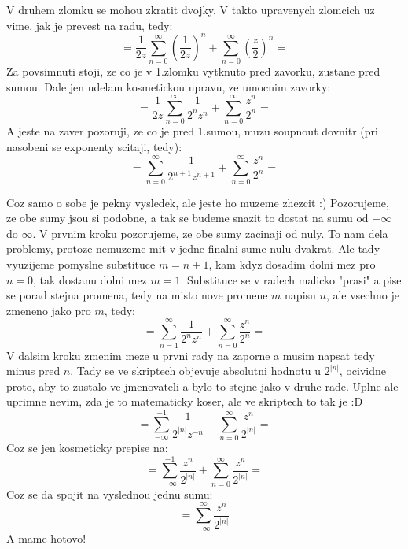 V druhem zlomku se mohou zkratit dvojky. V takto upravenych zlomcich uz vime, jak je prevest na radu, tedy:
$$ = \frac{1}{2z} \sum_{n=0}^\infty \left( \frac{1}{2z}\right)^n + \sum_{n=0}^\infty \left(\frac{z}{2}\right) ^n = $$
Za povsimnuti stoji, ze co je v 1.zlomku vytknuto pred zavorku, zustane pred sumou. Dale jen udelam kosmetickou upravu, ze umocnim zavorky:
$$=\frac{1}{2z} \sum_{n=0}^\infty \frac{1}{2^n z^n} + \sum_{n=0}^\infty \frac{z^n}{2^n} =$$
A jeste na zaver pozoruji, ze co je pred 1.sumou, muzu soupnout dovnitr (pri nasobeni se exponenty scitaji, tedy):
$$ = \sum_{n=0}^\infty \frac{1}{2^{n+1} z^{n+1}} + \sum_{n=0}^\infty \frac{z^n}{2^n} = $$

Coz samo o sobe je pekny vysledek, ale jeste ho muzeme zhezcit :) Pozorujeme, ze obe sumy jsou si podobne, a tak se budeme snazit to dostat na sumu od $-\infty$ do $\infty$. V prvnim kroku pozorujeme, ze obe sumy zacinaji od nuly. To nam dela problemy, protoze nemuzeme mit v jedne finalni sume nulu dvakrat. Ale tady vyuzijeme pomyslne substituce $m=n+1$, kam kdyz dosadim dolni mez pro $n=0$, tak dostanu dolni mez $m=1$. Substituce se v radech malicko "prasi" a pise se porad stejna promena, tedy na misto nove promene $m$ napisu $n$, ale vsechno je zmeneno jako pro $m$, tedy:
$$ = \sum_{n=1}^\infty \frac{1}{2^{n} z^{n}} + \sum_{n=0}^\infty \frac{z^n}{2^n} = $$
V dalsim kroku zmenim meze u prvni rady na zaporne a musim napsat tedy minus pred $n$. Tady se ve skriptech objevuje absolutni hodnotu u $2^{|n|}$, ocividne proto, aby to zustalo ve jmenovateli a bylo to stejne jako v druhe rade. Uplne ale uprimne nevim, zda je to matematicky koser, ale ve skriptech to tak je :D
$$ = \sum_{-\infty}^{-1} \frac{1}{2^{|n|} z^{-n}} + \sum_{n=0}^\infty \frac{z^n}{2^{|n|}} = $$
Coz se jen kosmeticky prepise na:
$$ = \sum_{-\infty}^{-1} \frac{z^n}{2^{|n|}} + \sum_{n=0}^\infty \frac{z^n}{2^{|n|}} = $$
Coz se da spojit na vyslednou jednu sumu:
$$ = \sum_{-\infty}^\infty \frac{z^n}{2^{|n|}}$$
A mame hotovo!